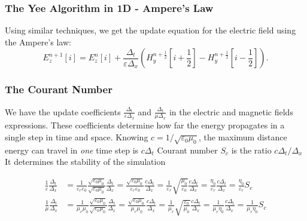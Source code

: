 \documentclass[10pt]{beamer}
\newcommand{\E}{\varepsilon}  %
\renewcommand{\u}{\mu}  %
\begin{document}
\begin{frame}
    \frametitle{The Yee Algorithm in 1D - Ampere's Law}
    Using similar techniques, we get the update equation for the electric field using the Ampere's law:
    \begin{equation}
        E_z^{n+1}\left[i\right] = E_z^{n}\left[i\right] +
        \frac{\Delta_t}{\E\Delta_x}
        \left(H_y^{n+\frac{1}{2}}\left[i+\frac{1}{2}\right] - H_y^{n+\frac{1}{2}}\left[i-\frac{1}{2}\right]\right).
    \end{equation}

\end{frame}

\begin{frame}
    \frametitle{The Courant Number}
    \begin{outline}
        \1 We have the update coefficients $\frac{\Delta_t}{\E\Delta_x}$ and $\frac{\Delta_t}{\u\Delta_x}$  in the electric and magnetic fields expressions.
        \1 These coefficients determine how far the energy propagates in a single step in time and space.
        \1 Knowing $c = 1/\sqrt{\E_0 \u_0}$, the maximum distance energy can travel in \textit{one} time step is $c \Delta_t$
        \1 Courant number $S_c$ is the ratio $c \Delta_t / \Delta_x$
        \2 It determines the stability of the simulation
    \end{outline}

    \begin{align*}
        \frac{1}{\E} \frac{\Delta_{t}}{\Delta_{x}} & =\frac{1}{\E_{r} \E_{0}} \frac{\sqrt{\E_{0} \u_{0}}}{\sqrt{\E_{0} \u_{0}}} \frac{\Delta_{t}}{\Delta_{x}}=\frac{\sqrt{\E_{0} \u_{0}}}{\E_{r} \E_{0}} \frac{c \Delta_{t}}{\Delta_{x}}=\frac{1}{\E_{r}} \sqrt{\frac{\u_{0}}{\E_{0}}} \frac{c \Delta_{t}}{\Delta_{x}}=\frac{\eta_{0}}{\E_{r}} \frac{c \Delta_{t}}{\Delta_{x}}=\frac{\eta_{0}}{\E_{r}} S_{c}      \\
        \frac{1}{\u} \frac{\Delta_{t}}{\Delta_{x}} & = \frac{1}{\u_{r} \u_{0}} \frac{\sqrt{\E_{0} \u_{0}}}{\sqrt{\E_{0} \u_{0}}} \frac{\Delta_{t}}{\Delta_{x}}=\frac{\sqrt{\E_{0} \u_{0}}}{\u_{r} \u_{0}} \frac{c \Delta_{t}}{\Delta_{x}}=\frac{1}{\u_{r}} \sqrt{\frac{\E_{0}}{\u_{0}}} \frac{c \Delta_{t}}{\Delta_{x}}=\frac{1}{\u_{r} \eta_{0}} \frac{c \Delta_{t}}{\Delta_{x}}=\frac{1}{\u_{r} \eta_{0}} S_{c}
    \end{align*}
\end{frame}
\end{document}
